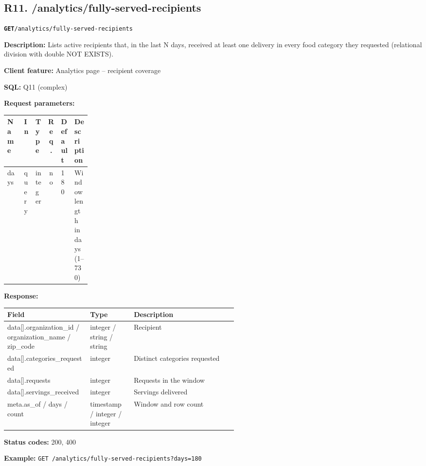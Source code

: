 \documentclass[11pt,letterpaper]{article}
\newcommand{\brk}{\penalty0\relax}
\newcommand{\routebar}[2]{%
  \par\noindent\colorbox{boxGray}{\parbox{\dimexpr\linewidth-2\fboxsep}{%
  \strut\textbf{\texttt{#1}}\quad\texttt{#2}\strut}}\par\smallskip}
\newcommand{\kv}[2]{\textbf{#1:} #2\par}
\begin{document}
\subsection*{R11. /analytics/fully-served-recipients}
\routebar{GET}{/analytics/fully-served-recipients}
\kv{Description}{Lists active recipients that, in the last N days, received at least one delivery in every food category they requested (relational division with double NOT EXISTS).}
\kv{Client feature}{Analytics page -- recipient coverage}
\kv{SQL}{Q11 (complex)}
\kv{Request parameters}{}
\begin{xltabular}{\linewidth}{>{\ttfamily\raggedright\arraybackslash}p{0.2\linewidth} l l c l >{\raggedright\arraybackslash}X}
\toprule
\textrm{\textbf{Name}} & \textbf{In} & \textbf{Type} & \textbf{Req.} & \textbf{Default} & \textbf{Description} \\
\midrule
days & query & integer & no & 180 & Window length in days (1--730) \\
\bottomrule
\end{xltabular}
\kv{Response}{}
\begin{xltabular}{\linewidth}{>{\ttfamily\raggedright\arraybackslash}p{0.36\linewidth} >{\raggedright\arraybackslash}p{0.19\linewidth} >{\raggedright\arraybackslash}X}
\toprule
\textrm{\textbf{Field}} & \textbf{Type} & \textbf{Description} \\
\midrule
data[].\brk{}organization\_id /\brk{} organization\_name /\brk{} zip\_code & integer / string / string & Recipient \\
data[].\brk{}categories\_requested & integer & Distinct categories requested \\
data[].\brk{}requests & integer & Requests in the window \\
data[].\brk{}servings\_received & integer & Servings delivered \\
meta.\brk{}as\_of /\brk{} days /\brk{} count & timestamp / integer / integer & Window and row count \\
\bottomrule
\end{xltabular}
\kv{Status codes}{200, 400}
{\raggedright\textbf{Example:} {\small \texttt{GET /\brk{}analytics/\brk{}fully-served-recipients?\brk{}days=\brk{}180}}\par}
\end{document}
